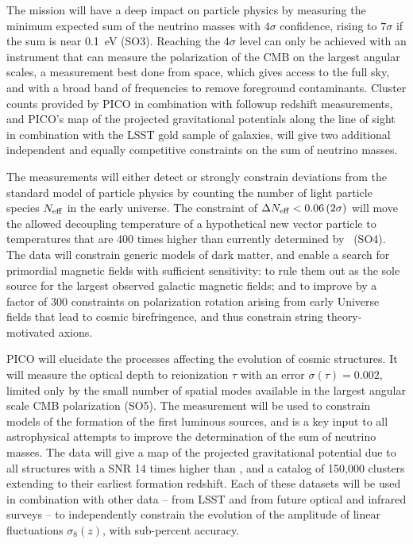 \documentclass[PICOReport.tex]{subfiles}
\begin{document}
The mission will have a deep impact on particle physics by measuring the minimum expected sum of the neutrino masses with $4\sigma$ confidence, rising to $7\sigma$ if the sum is near 0.1~eV (SO3). Reaching the $4\sigma$ level can only be achieved with an instrument that can measure the polarization of the CMB on the largest angular scales, a measurement best done from space, which gives access to the full sky, and with a broad band of frequencies to remove foreground contaminants.  
Cluster counts provided by PICO in combination with followup redshift measurements, and PICO's map of the projected gravitational potentials along the line of sight in combination with the LSST gold sample of galaxies, will give two additional independent and equally competitive constraints on the sum of neutrino masses. 

The measurements will either detect or strongly constrain deviations from the standard model of particle physics by counting the number of light particle species $N_{\rm eff}$ in the early universe.  The constraint of $\Delta N_{\rm eff} < 0.06 \, (2\sigma)$ will move the allowed decoupling temperature of a hypothetical new vector particle to temperatures that are 400 times higher than currently determined by \planck\ (SO4). The data will constrain generic models of dark matter, and enable a search for primordial magnetic fields with sufficient sensitivity: to rule them out as the sole source for the largest observed galactic magnetic fields; and to improve by a factor of 300 constraints on polarization rotation arising from early Universe fields that lead to cosmic birefringence, and thus constrain string theory-motivated axions. 

PICO will elucidate the processes affecting the evolution of cosmic structures. It will measure the optical depth to reionization $\tau$ with an error $\sigma(\tau) = 0.002$, limited only by the small number of spatial modes available in the largest angular scale CMB polarization (SO5). The measurement will be used to constrain models of the formation of the first luminous sources, and is a key input to all astrophysical attempts to improve the determination of the sum of neutrino masses. The data will give a map of the projected gravitational potential due to all structures with a \ac{SNR} 14 times higher than \planck , and a catalog of 150,000 clusters extending to their earliest formation redshift. Each of these datasets will be used in combination with other data -- from LSST and from future optical and infrared surveys -- to independently constrain the evolution of the amplitude of linear fluctuations $\sigma_{8}(z)$, with sub-percent accuracy.  
\end{document}
